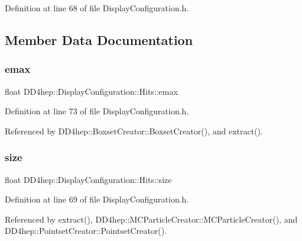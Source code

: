 Definition at line 68 of file Display\+Configuration.\+h.



\subsection{Member Data Documentation}
\hypertarget{struct_d_d4hep_1_1_display_configuration_1_1_hits_ad38efa49f6d6183fd60e34e3d53756a1}{}\label{struct_d_d4hep_1_1_display_configuration_1_1_hits_ad38efa49f6d6183fd60e34e3d53756a1} 
\subsubsection{\texorpdfstring{emax}{emax}}
{\footnotesize\ttfamily float D\+D4hep\+::\+Display\+Configuration\+::\+Hits\+::emax}



Definition at line 73 of file Display\+Configuration.\+h.



Referenced by D\+D4hep\+::\+Boxset\+Creator\+::\+Boxset\+Creator(), and extract().

\hypertarget{struct_d_d4hep_1_1_display_configuration_1_1_hits_ad11b0d78e70f65eab8742ec341a48bd8}{}\label{struct_d_d4hep_1_1_display_configuration_1_1_hits_ad11b0d78e70f65eab8742ec341a48bd8} 
\subsubsection{\texorpdfstring{size}{size}}
{\footnotesize\ttfamily float D\+D4hep\+::\+Display\+Configuration\+::\+Hits\+::size}



Definition at line 69 of file Display\+Configuration.\+h.



Referenced by extract(), D\+D4hep\+::\+M\+C\+Particle\+Creator\+::\+M\+C\+Particle\+Creator(), and D\+D4hep\+::\+Pointset\+Creator\+::\+Pointset\+Creator().

\hypertarget{struct_d_d4hep_1_1_display_configuration_1_1_hits_ae708bf5cabed5cb9c82734b7bfac0373}{}\label{struct_d_d4hep_1_1_display_configuration_1_1_hits_ae708bf5cabed5cb9c82734b7bfac0373} 
